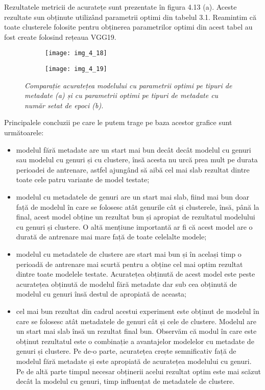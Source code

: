 Rezultatele metricii de acuratețe sunt prezentate în figura 4.13 (a). Aceste rezultate sun obținute utilizând parametrii optimi din tabelul 3.1. Reamintim că toate clusterele folosite pentru obținerea parametrilor optimi din acest tabel au fost create folosind rețeaua VGG19.
\begin{figure}[!h]
  \begin{subfigure}[b]{0.5\textwidth}
    \texttt{[image: img\_4\_18]}
    \caption{}
    \label{fig:f1}
  \end{subfigure}
  \hfill
  \begin{subfigure}[b]{0.5\textwidth}
    \texttt{[image: img\_4\_19]}
    \caption{}
    \label{fig:f2}
  \end{subfigure}
  \caption[Comparație acuratețea modelului cu parametrii optimi pe tipuri de metadate]{\textit{Comparație acuratețea modelului cu parametrii optimi pe tipuri de metadate (a) și cu parametrii optimi pe tipuri de metadate cu număr setat de epoci (b).}}
\end{figure}
Principalele concluzii pe care le putem trage pe baza acestor grafice sunt următoarele:
\begin{itemize}
	\item modelul fără metadate are un start mai bun decât decât modelul cu genuri sau modelul cu genuri și cu clustere, însă acesta nu urcă prea mult pe durata perioadei de antrenare, astfel ajungând să aibă cel mai slab rezultat dintre toate cele patru variante de model testate;
	\item modelul cu metadatele de genuri are un start mai slab, fiind mai bun doar față de modelul în care se folosesc atât genurile cât și clusterele, însă, până la final, acest model obține un rezultat bun și apropiat de rezultatul modelului cu genuri și clustere. O altă mențiune importantă ar fi că acest model are o durată de antrenare mai mare față de toate celelalte modele;
	\item modelul cu metadatele de clustere are start mai bun și în același timp o perioadă de antrenare mai scurtă pentru a obține cel mai optim rezultat dintre toate modelele testate. Acuratețea obținută de acest model este peste acuratețea obținută de modelul fără metadate dar sub cea obținută de modelul cu genuri însă destul de apropiată de aceasta;
	\item cel mai bun rezultat din cadrul acestui experiment este obținut de modelul în care se folosesc atât metadatele de genuri cât și cele de clustere. Modelul are un start mai slab însă un rezultat final bun. Observăm că modul în care este obținut rezultatul este o combinație a avantajelor modelelor cu metadate de genuri și clustere. Pe de-o parte, acuratețea crește semnificativ față de modelul fără metadate și este apropiată de acuratețea modelului cu genuri. Pe de altă parte timpul necesar obținerii acelui rezultat optim este mai scăzut decât la modelul cu genuri, timp influențat de metadatele de clustere.
\end{itemize}

